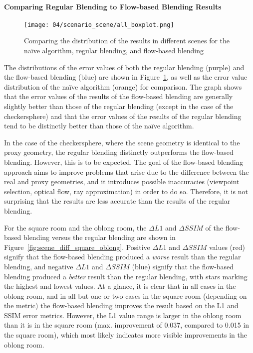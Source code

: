 \paragraph{Comparing Regular Blending to Flow-based Blending Results}

\begin{figure}
		\centering
		\texttt{[image: 04/scenario\_scene/all\_boxplot.png]}
		\caption[The distribution of results in different scenes]{Comparing the distribution of the results in different scenes for the na\"ive algorithm, regular blending, and flow-based blending}
		\label{fig:scenario_scene_boxplot}
\end{figure}

The distributions of the error values of both the regular blending (purple) and the flow-based blending (blue) are shown in Figure~\ref{fig:scenario_scene_boxplot}, as well as the error value distribution of the na\"ive algorithm (orange) for comparison\footnotemark. The graph shows that the error values of the results of the flow-based blending are generally slightly better than those of the regular blending (except in the case of the checkersphere) and that the error values of the results of the regular blending tend to be distinctly better than those of the na\"ive algorithm. 

In the case of the checkersphere, where the scene geometry is identical to the proxy geometry, the regular blending distinctly outperforms the flow-based blending. However, this is to be expected. The goal of the flow-based blending approach aims to improve problems that arise due to the difference between the real and proxy geometries, and it introduces possible inaccuracies (viewpoint selection, optical flow, ray approximation) in order to do so. Therefore, it is not surprising that the results are less accurate than the results of the regular blending.

For the square room and the oblong room, the $\Delta L1$ and $\Delta SSIM$ of the flow-based blending versus the regular blending are shown in Figure~\ref{fig:scene_diff_square_oblong}. Positive $\Delta L1$ and $\Delta SSIM$ values (red) signify that the flow-based blending produced a \emph{worse} result than the regular blending, and negative $\Delta L1$ and $\Delta SSIM$ (blue) signify that the flow-based blending produced a \emph{better} result than the regular blending, with stars marking the highest and lowest values. At a glance, it is clear that in all cases in the oblong room, and in all but one or two cases in the square room (depending on the metric) the flow-based blending improves the result based on the L1 and SSIM error metrics. However, the L1 value range is larger in the oblong room than it is in the square room (max. improvement of 0.037, compared to 0.015 in the square room), which most likely indicates more visible improvements in the oblong room.


